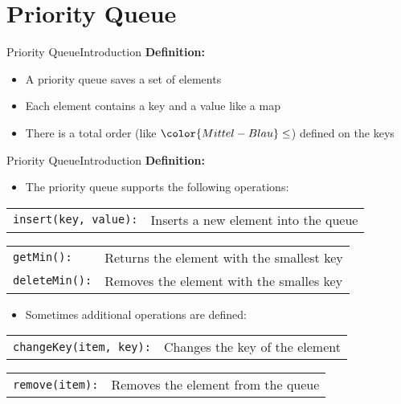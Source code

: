 
\section{Priority Queue}


\begin{frame}{Priority Queue}{Introduction}
  \textbf{Definition:}
  \begin{itemize}
    \item<2->
      A priority queue saves a set of elements
    \item<3->
      Each element contains a key and a value like a map
    \item<4->
      There is a total order (like ${\color{Mittel-Blau}\leq}$) defined on the
      keys
  \end{itemize}
\end{frame}


\begin{frame}{Priority Queue}{Introduction}
  \textbf{Definition:}
  \begin{itemize}
    \item<2->
      The priority queue supports the following operations:
  \end{itemize}
  \begin{tabular}{ll}
    {\color{Mittel-Blau}\texttt{insert(key, value):}} &
    Inserts a new element into the queue
  \end{tabular}
  \begin{tabular}{ll}
    {\color{Mittel-Blau}\texttt{getMin():}} &
    Returns the element with the smallest key\\
    {\color{Mittel-Blau}\texttt{deleteMin():}} &
    Removes the element with the smalles key
  \end{tabular}
  \vspace{1.0em}
  \begin{itemize}
    \item<5->
      Sometimes additional operations are defined:
  \end{itemize}
  \begin{tabular}{ll}
    {\color{Mittel-Blau}\texttt{changeKey(item, key):}} &
    Changes the key of the element
  \end{tabular}
  \begin{tabular}{ll}
    {\color{Mittel-Blau}\texttt{remove(item):}} &
    Removes the element from the queue
  \end{tabular}
\end{frame}


